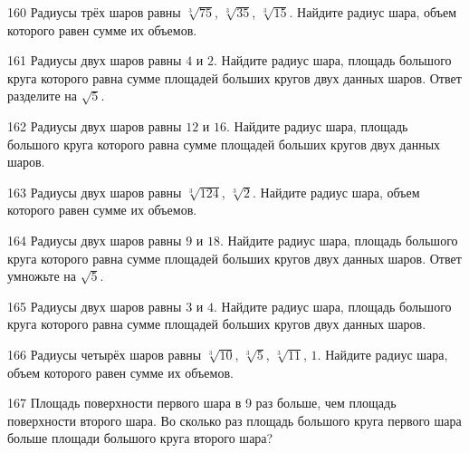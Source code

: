 \documentclass[a4paper]{article}
\begin{document}
\begin{taskBN}{160}
Радиусы трёх шаров равны $\sqrt[3]{75}$, $\sqrt[3]{35}$, $\sqrt[3]{15}$. Найдите радиус шара, объем которого равен сумме их объемов.
\end{taskBN}

\begin{taskBN}{161}
Радиусы двух шаров равны $4$ и $2$. Найдите радиус шара, площадь большого круга которого равна сумме площадей больших кругов двух данных шаров. Ответ разделите на $\sqrt{5}$.
\end{taskBN}

\begin{taskBN}{162}
Радиусы двух шаров равны $12$ и $16$. Найдите радиус шара, площадь большого круга которого равна сумме площадей больших кругов двух данных шаров.
\end{taskBN}

\begin{taskBN}{163}
Радиусы двух шаров равны $\sqrt[3]{124}$, $\sqrt[3]{2}$. Найдите радиус шара, объем которого равен сумме их объемов.
\end{taskBN}

\begin{taskBN}{164}
Радиусы двух шаров равны $9$ и $18$. Найдите радиус шара, площадь большого круга которого равна сумме площадей больших кругов двух данных шаров. Ответ умножьте на $\sqrt{5}$.
\end{taskBN}

\begin{taskBN}{165}
Радиусы двух шаров равны $3$ и $4$. Найдите радиус шара, площадь большого круга которого равна сумме площадей больших кругов двух данных шаров.
\end{taskBN}

\begin{taskBN}{166}
Радиусы четырёх шаров равны $\sqrt[3]{10}$, $\sqrt[3]{5}$, $\sqrt[3]{11}$, $1$. Найдите радиус шара, объем которого равен сумме их объемов.
\end{taskBN}

\begin{taskBN}{167}
Площадь поверхности первого шара в 9 раз больше, чем площадь поверхности второго шара. Во сколько раз площадь большого круга первого шара больше площади большого круга второго шара?
\end{taskBN}
\end{document}
